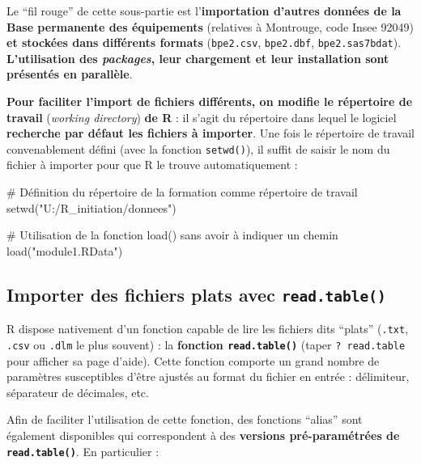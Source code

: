 \documentclass[12pt,twosided, notitlepage]{book}
\newenvironment{Shaded}{}{}
\newcommand{\KeywordTok}[1]{\textcolor[rgb]{0.00,0.00,1.00}{{#1}}}
\newcommand{\StringTok}[1]{\textcolor[rgb]{0.00,0.50,0.50}{{#1}}}
\newcommand{\CommentTok}[1]{\textcolor[rgb]{0.00,0.50,0.00}{{#1}}}
\newcommand{\NormalTok}[1]{{#1}}
\renewenvironment{Shaded}{\begin{snugshade}}{\end{snugshade}}
\begin{document}
Le \enquote{fil rouge} de cette sous-partie est l'\textbf{importation
d'autres données de la Base permanente des équipements} (relatives à
Montrouge, code Insee 92049) \textbf{et stockées dans différents
formats} (\texttt{bpe2.csv}, \texttt{bpe2.dbf}, \texttt{bpe2.sas7bdat}).
\textbf{L'utilisation des \emph{packages}, leur chargement et leur
installation sont présentés en parallèle}.

\textbf{Pour faciliter l'import de fichiers différents, on modifie le
répertoire de travail} (\emph{working directory}) \textbf{de R} : il
s'agit du répertoire dans lequel le logiciel \textbf{recherche par
défaut les fichiers à importer}. Une fois le répertoire de travail
convenablement défini (avec la fonction
\texttt{setwd()}), il suffit de saisir le nom du
fichier à importer pour que R le trouve automatiquement
:

\begin{Shaded}
\begin{Highlighting}[]
\CommentTok{# Définition du répertoire de la formation comme répertoire de travail}
\KeywordTok{setwd}\NormalTok{(}\StringTok{"U:/R_initiation/donnees"}\NormalTok{)}

\CommentTok{# Utilisation de la fonction load() sans avoir à indiquer un chemin}
\KeywordTok{load}\NormalTok{(}\StringTok{"module1.RData"}\NormalTok{)}
\end{Highlighting}
\end{Shaded}

\subsection{\texorpdfstring{Importer des fichiers plats avec
\texttt{read.table()}}{Importer des fichiers plats avec read.table()}}\label{importer-des-fichiers-plats-avec-read.table}

R dispose nativement d'un fonction capable de lire les fichiers dits
\enquote{plats} (\texttt{.txt}, \texttt{.csv} ou \texttt{.dlm} le plus
souvent) : la \textbf{fonction
\texttt{read.table()}} (taper
\texttt{?\ read.table} pour afficher sa page d'aide). Cette fonction
comporte un grand nombre de paramètres susceptibles d'être ajustés au
format du fichier en entrée : délimiteur, séparateur de décimales, etc.

Afin de faciliter l'utilisation de cette fonction, des fonctions
\enquote{alias} sont également disponibles qui correspondent à des
\textbf{versions pré-paramétrées de \texttt{read.table()}}. En
particulier :
\end{document}
